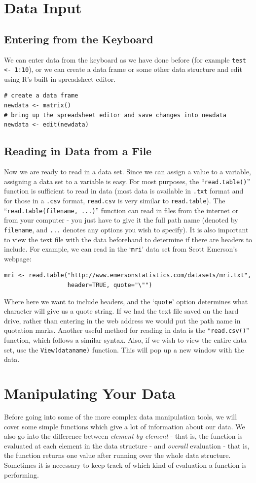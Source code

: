 \documentclass[11pt,letterpaper,fleqn]{report}
\begin{document}
\chapter{Data Input}
\section{Entering from the Keyboard}
We can enter data from the keyboard as we have done before (for example \texttt{test <- 1:10}), or we can create a data frame or some other data structure and edit using R's built in spreadsheet editor. 
\begin{verbatim}
# create a data frame
newdata <- matrix()
# bring up the spreadsheet editor and save changes into newdata
newdata <- edit(newdata)
\end{verbatim}
\section{Reading in Data from a File}
Now we are ready to read in a data set. Since we can assign a value to a variable, assigning a data set to a variable is easy. For most purposes, the ``\texttt{read.table()}'' function is sufficient to read in data (most data is available in \texttt{.txt} format and for those in a \texttt{.csv} format, \texttt{read.csv} is very similar to \texttt{read.table}). The ``\texttt{read.table(filename, ...)}'' function can read in files from the internet or from your computer - you just have to give it the full path name (denoted by \texttt{filename}, and \texttt{...} denotes any options you wish to specify). It is also important to view the text file with the data beforehand to determine if there are headers to include.  For example, we can read in the `\texttt{mri}' data set from Scott Emerson's webpage:
\begin{verbatim}
mri <- read.table("http://www.emersonstatistics.com/datasets/mri.txt", 
                  header=TRUE, quote="\"")
\end{verbatim}
Where here we want to include headers, and the `\texttt{quote}' option determines what character will give us a quote string. If we had the text file saved on the hard drive, rather than entering in the web address we would put the path name in quotation marks. Another useful method for reading in data is the ``\texttt{read.csv()}'' function, which follows a similar syntax. Also, if we wish to view the entire data set, use the \texttt{View(dataname)} function. This will pop up a new window with the data.
\chapter{Manipulating Your Data}
Before going into some of the more complex data manipulation tools, we will cover some simple functions which give a lot of information about our data. We also go into the difference between \emph{element by element} - that is, the function is evaluated at each element in the data structure - and \emph{overall} evaluation - that is, the function returns one value after running over the whole data structure. Sometimes it is necessary to keep track of which kind of evaluation a function is performing.
\end{document}
